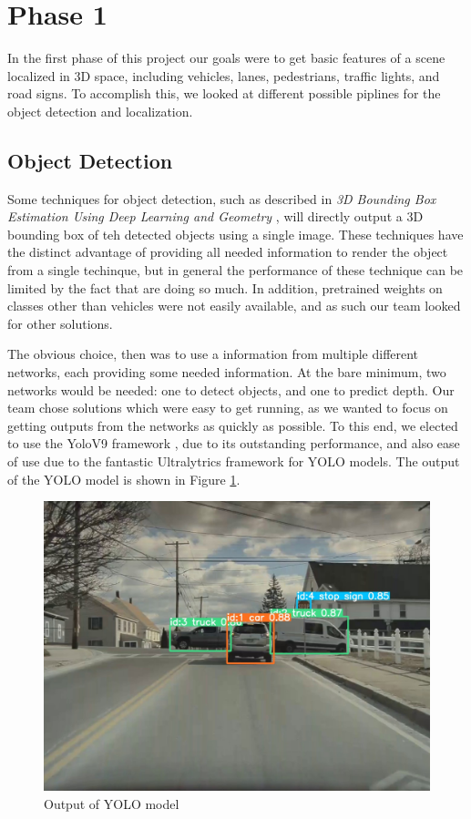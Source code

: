 \section{Phase 1}
In the first phase of this project our goals were to get basic features of a scene localized in 3D space, including vehicles, lanes, pedestrians, traffic lights, and road signs. To accomplish this, we looked at different possible piplines for the object detection and localization.

\subsection{Object Detection}
Some techniques for object detection, such as described in \emph{3D Bounding Box Estimation Using Deep Learning and Geometry} \cite{3DBoxEstimation}, will directly output a 3D bounding box of teh detected objects using a single image. These techniques have the distinct advantage of providing all needed information to render the object from a single techinque, but in general the performance of these technique can be limited by the fact that are doing so much. In addition, pretrained weights on classes other than vehicles were not easily available, and as such our team looked for other solutions.

The obvious choice, then was to use a information from multiple different networks, each providing some needed information. At the bare minimum, two networks would be needed: one to detect objects, and one to predict depth. Our team chose solutions which were easy to get running, as we wanted to focus on getting outputs from the networks as quickly as possible. To this end, we elected to use the YoloV9 framework \cite{YOLOv9}, due to its outstanding performance, and also ease of use due to the fantastic Ultralytrics framework for YOLO models. The output of the YOLO model is shown in Figure \ref{fig:yolo_output}.

\begin{figure}
    \centering
    \includegraphics[width=0.95\linewidth]{images/YOLOv9.jpg}
    \caption{Output of YOLO model}
    \label{fig:yolo_output}
\end{figure}

